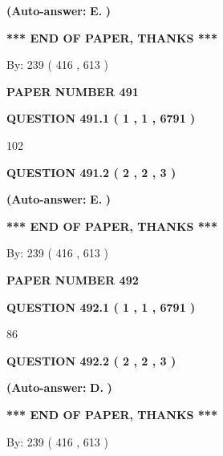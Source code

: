 \documentclass{ctexart}
\begin{document}
 
{\textbf{(Auto-answer:}}
{\textbf{\large{
E.}}}
{\textbf{)}}
 
 
   
   
   
   
\vspace{1.0in} 
{\textbf{\large{ *** END OF PAPER, THANKS *** }}} 
   
   
\hspace{1.0in} By: 
 239 ( 416 ,  613 )
   
   
   
   
\newpage 
\setcounter{page}{ 
   491001 } 
   
   
 {\textbf{ \Large{ PAPER NUMBER  491  }}}
   
   
   
   
  
  
{\textbf{\large{QUESTION
491.1 
 ( 1 , 1 , 6791 )
}}}

102
  
  
{\textbf{\large{QUESTION
491.2 
 ( 2 , 2 , 3 )
}}}
 
 
{\textbf{(Auto-answer:}}
{\textbf{\large{
E.}}}
{\textbf{)}}
 
 
   
   
   
   
\vspace{1.0in} 
{\textbf{\large{ *** END OF PAPER, THANKS *** }}} 
   
   
\hspace{1.0in} By: 
 239 ( 416 ,  613 )
   
   
   
   
\newpage 
\setcounter{page}{ 
   492001 } 
   
   
 {\textbf{ \Large{ PAPER NUMBER  492  }}}
   
   
   
   
  
  
{\textbf{\large{QUESTION
492.1 
 ( 1 , 1 , 6791 )
}}}

86
  
  
{\textbf{\large{QUESTION
492.2 
 ( 2 , 2 , 3 )
}}}
 
 
{\textbf{(Auto-answer:}}
{\textbf{\large{
D.}}}
{\textbf{)}}
 
 
   
   
   
   
\vspace{1.0in} 
{\textbf{\large{ *** END OF PAPER, THANKS *** }}} 
   
   
\hspace{1.0in} By: 
 239 ( 416 ,  613 )
   
   
   
\end{document}
